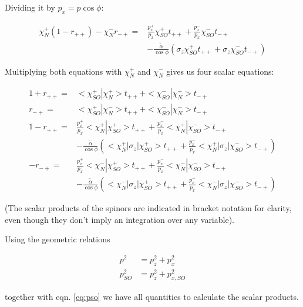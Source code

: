 \documentclass[11pt]{article}
\newcommand{\ta}{\tilde \alpha}
\begin{document}
Dividing it by  $p_x = p \cos \phi$: 

\begin{align}
    \chi_N^+ (1 - r_{++}) - \chi_N^- r_{-+}
        =& \frac{p_x^+}{p_x} \chi_{SO}^+ t_{++} + \frac{p_x^-}{p_x} \chi_{SO}^- t_{-+} \nonumber\\
         &   - \frac{\ta}{\cos \phi} \left(\sigma_z \chi_{SO}^+
                 t_{++} + \sigma_z \chi_{SO}^- t_{-+} \right)
\end{align}

Multiplying both equations with $\chi_N^+$ and $\chi_N^-$ gives us
four scalar equations:

\begin{align} 
    \label{eq:a1}
    1 + r_{++}  =& <\chi_{SO}^+|\chi_N^+> t_{++} +
                    <\chi_{SO}^-|\chi_N^+> t_{-+}\\
    \label{eq:a2}
        r_{-+}  =& <\chi_{SO}^+|\chi_N^-> t_{++} + <\chi_{SO}^-|\chi_N^-> t_{-+}\\
    \label{eq:b1}
    1 - r_{++}
        =& \frac{p_x^+}{p_x} <\chi_N^+|\chi_{SO}^+> t_{++}
           + \frac{p_x^-}{p_x} <\chi_N^+|\chi_{SO}^-> t_{-+} \nonumber\\
         &   - \frac{\ta}{\cos \phi} \left(
                 <\chi_N^+|\sigma_z|\chi_{SO}^+>
                 t_{++} + \frac{p_x^-}{p_x} 
                 <\chi_N^+|\sigma_z|\chi_{SO}^-> t_{-+} \right)\\
    \label{eq:b2}
    -r_{-+}
        =& \frac{p_x^+}{p_x} <\chi_N^-|\chi_{SO}^+> t_{++}
           + \frac{p_x^-}{p_x} <\chi_N^-|\chi_{SO}^-> t_{-+} \nonumber\\
         &   - \frac{\ta}{\cos \phi} \left(
                 <\chi_N^-|\sigma_z|\chi_{SO}^+>
                 t_{++} + \frac{p_x^-}{p_x} 
                 <\chi_N^-|\sigma_z|\chi_{SO}^-> t_{-+} \right)
\end{align}

(The scalar products of the spinors are indicated in bracket notation
for clarity, even though they don't imply an integration over any
variable).

Using the geometric relations

\begin{align}
    p^2         &= p_z^2 + p_x^2\\
    p_{SO}^2    &= p_z^2 + p_{x,SO}^2
\end{align}

together with eqn. \ref{eq:pso} we have all quantities to calculate
the scalar products.
\end{document}
